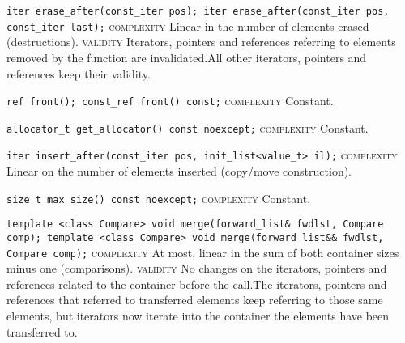 \noindent{}\hspace*{0.25em}\lstinline[basicstyle=\ttfamily\color{corange}]{iter erase_after(const_iter pos); iter erase_after(const_iter pos, const_iter last);} \textsc{complexity} Linear in the number of elements erased (destructions). \textsc{validity} Iterators, pointers and references referring to elements removed by the function are invalidated.All other iterators, pointers and references keep their validity.\\\vspace{-0.6em}

\noindent{}\hspace*{0.25em}\lstinline[basicstyle=\ttfamily\color{cgreen}]{ref front(); const_ref front() const;} \textsc{complexity} Constant.\\\vspace{-0.6em}

\noindent{}\hspace*{0.25em}\lstinline[basicstyle=\ttfamily\color{cgreen}]{allocator_t get_allocator() const noexcept;} \textsc{complexity} Constant.\\\vspace{-0.6em}

\noindent{}\hspace*{0.25em}\lstinline[basicstyle=\ttfamily\color{corange}]{iter insert_after(const_iter pos, init_list<value_t> il);} \textsc{complexity} Linear on the number of elements inserted (copy/move construction).\\\vspace{-0.6em}

\noindent{}\hspace*{0.25em}\lstinline[basicstyle=\ttfamily\color{cgreen}]{size_t max_size() const noexcept;} \textsc{complexity} Constant.\\\vspace{-0.6em}

\noindent{}\hspace*{0.25em}\lstinline[basicstyle=\ttfamily\color{corange}]{template <class Compare> void merge(forward_list& fwdlst, Compare comp); template <class Compare> void merge(forward_list&& fwdlst, Compare comp);} \textsc{complexity} At most, linear in the sum of both container sizes minus one (comparisons). \textsc{validity} No changes on the iterators, pointers and references related to the container before the call.The iterators, pointers and references that referred to transferred elements keep referring to those same elements, but iterators now iterate into the container the elements have been transferred to.\\\vspace{-0.6em}

